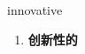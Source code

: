 
\begin{frame}
{\huge innovative}
\begin{center}
\begin{enumerate}\Large
  \item \textbf{创新性的}
\end{enumerate}
\end{center}
\end{frame}
